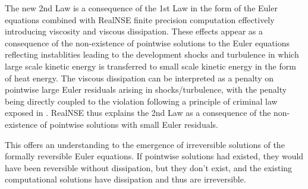 The new 2nd Law is a consequence of the 1st Law 
in the form of the Euler equations combined with RealNSE
finite precision computation effectively introducing 
viscosity and viscous dissipation. These effects 
appear as a consequence of the non-existence of pointwise solutions to 
the Euler equations reflecting instablities leading to 
the development shocks and turbulence in which
large scale kinetic energy is transferred to small scale
kinetic energy in the form of heat energy. The viscous dissipation
can be interpreted as a penalty on pointwise
large Euler residuals arising in shocks/turbulence,
with the penalty being directly coupled to the violation
following a principle of criminal law exposed in \cite{foucault}.  
RealNSE thus explains the 2nd Law as a consequence of 
the non-existence of pointwise solutions with small Euler residuals.

This offers an understanding to the emergence of irreversible
solutions of the formally reversible Euler equations. 
If pointwise solutions had existed, they would have been 
reversible without dissipation, but they don't exist, and the
existing computational solutions have dissipation and thus are
irreversible.





